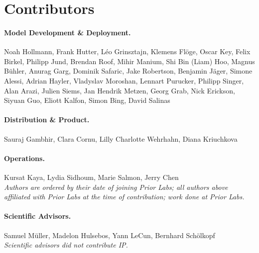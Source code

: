 \section{Contributors}\label{app:contributors}

\paragraph{Model Development \& Deployment.}
Noah Hollmann,
Frank Hutter,
L\'eo Grinsztajn,
Klemens Flöge,
Oscar Key,
Felix Birkel,
Philipp Jund,
Brendan Roof,
Mihir Manium,
Shi Bin (Liam) Hoo,
Magnus Bühler,
Anurag Garg,
Dominik Safaric,
Jake Robertson,
Benjamin Jäger,
Simone Alessi,
Adrian Hayler,
Vladyslav Moroshan,
Lennart Purucker,
Philipp Singer,
Alan Arazi,
Julien Siems,
Jan Hendrik Metzen,
Georg Grab,
Nick Erickson,
Siyuan Guo,
Eliott Kalfon,
Simon Bing,
David Salinas
\vspace{-1em}
\paragraph{Distribution \& Product.}

Sauraj Gambhir,
Clara Cornu,
Lilly Charlotte Wehrhahn,
Diana Kriuchkova
\vspace{-2em}
\paragraph{Operations.}

Kursat Kaya,
Lydia Sidhoum,
Marie Salmon,
Jerry Chen
\\

\vspace{-0.5em}
\noindent\textit{Authors are ordered by their date of joining Prior Labs; all authors above affiliated with Prior Labs at the time of contribution; work done at Prior Labs.}

\vspace{0.75em}

\paragraph{Scientific Advisors.}
Samuel Müller, 
Madelon Hulsebos,
Yann LeCun,
Bernhard Schölkopf
\vspace{0.75em}
\\
\noindent\textit{Scientific advisors did not contribute IP.}



\vspace{1em}


